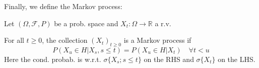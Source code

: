 Finally, we define the Markov process:

\begin{definition}
Let \((\Omega, \mathcal{F}, P)\) be a prob. space and \(X_t : \Omega \to \mathbb{R}\) a r.v.

For all \(t \geq 0\), the collection \((X_t)_{t \geq 0}\) is a Markov process if
\[
P(X_u \in H | X_s, s \leq t) = P(X_u \in H | X_t) \quad \forall t < u
\]
Here the cond. probab. is w.r.t. \(\sigma \{X_s; s \leq t\}\) on the RHS and \(\sigma \{X_t\}\) on the LHS.
\end{definition}


